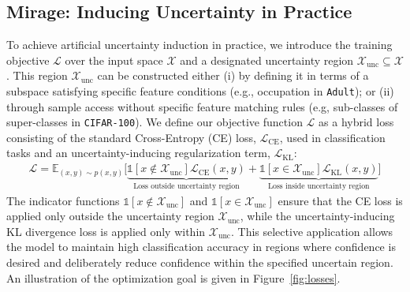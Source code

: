 \subsection{Mirage: Inducing Uncertainty in Practice} \label{sec:uncertainty-training}

To achieve artificial uncertainty induction in practice, we introduce the \attack training objective \(\mathcal{L}\) over the input space \(\mathcal{X}\) and a designated uncertainty region \(\mathcal{X}_\text{unc} \subseteq \mathcal{X}\). This region $\mathcal{X}_\text{unc}$ can be constructed either (i) by defining it in terms of a subspace satisfying specific feature conditions (e.g., occupation in \texttt{Adult}); or (ii) through sample access without specific feature matching rules (e.g, sub-classes of super-classes in \texttt{CIFAR-100}). We define our objective function \(\mathcal{L}\) as a hybrid loss consisting of the standard Cross-Entropy (CE) loss, \(\mathcal{L}_\text{CE}\), used in classification tasks and an uncertainty-inducing regularization term, \(\mathcal{L}_\text{KL}\):
\begin{equation}
\label{eq:mirage}
    \begin{split}
        \mathcal{L} = \mathbb{E}_{(x,y) \sim p(x, y)} \bigg[ \underbrace{\mathds{1}\left[x \not\in \mathcal{X}_\text{unc}\right] \mathcal{L}_\text{CE}(x, y)}_\text{Loss outside uncertainty region} + 
        \underbrace{\mathds{1}\left[x \in \mathcal{X}_\text{unc}\right] \mathcal{L}_\text{KL}(x, y)}_\text{Loss inside uncertainty region} \bigg]
    \end{split}
\end{equation}
The indicator functions \(\mathds{1}\left[x \not\in \mathcal{X}_\text{unc}\right]\) and \(\mathds{1}\left[x \in \mathcal{X}_\text{unc}\right]\) ensure that the CE loss is applied only outside the uncertainty region \(\mathcal{X}_\text{unc}\), while the uncertainty-inducing KL divergence loss is applied only within \(\mathcal{X}_\text{unc}\). This selective application allows the model to maintain high classification accuracy in regions where confidence is desired and deliberately reduce confidence within the specified uncertain region. An illustration of the optimization goal is given in Figure~\ref{fig:losses}.

